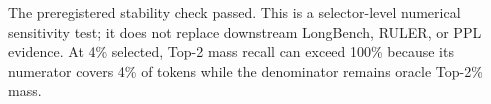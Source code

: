 \begin{table}[t]
\caption{Regret of frozen $\lambda=0.75$ relative to the best of five shrinkage candidates.}
\label{tab:shrinkage-regret}
\centering\small
{}
\end{table}

The preregistered stability check passed. This is a selector-level numerical sensitivity test; it does not replace downstream LongBench, RULER, or PPL evidence. At 4\% selected, Top-2 mass recall can exceed 100\% because its numerator covers 4\% of tokens while the denominator remains oracle Top-2\% mass.
